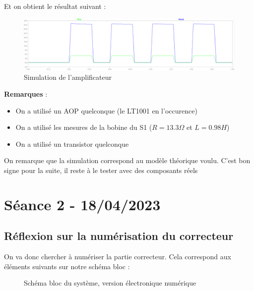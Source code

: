 \documentclass[11pt,a4paper]{article}
\begin{document}
Et on obtient le résultat suivant :
\begin{figure} [H]
\begin{center}
\includegraphics[width=1\textwidth]{Schémas/sim ampli.png} 
\end{center}
\caption{Simulation de l'amplificateur}
\end{figure}

\textbf{Remarques} :
\begin{itemize}
\item On a utilisé un AOP quelconque (le LT1001 en l'occurence)
\item On a utilisé les mesures de la bobine du S1 ($R=13.3\Omega$ et $L=0.98H$)
\item On a utilisé un transistor quelconque
\end{itemize}

On remarque que la simulation correspond au modèle théorique voulu. C'est bon signe pour la suite, il reste à le tester avec des composants réels

\pagebreak
\section{Séance 2 - 18/04/2023}
\subsection{Réflexion sur la numérisation du correcteur}
On va donc chercher à numériser la partie correcteur. Cela correspond aux éléments suivants sur notre schéma bloc :
\begin{figure} [H]
\begin{center}
\end{center}
\caption{Schéma bloc du système, version électronique numérique}
\end{figure}
\end{document}
